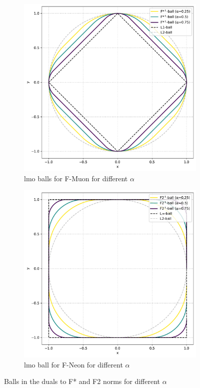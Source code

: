 \documentclass{article} %
\begin{document}
\begin{figure}[h!]
    \centering
    \begin{subfigure}[b]{0.48\linewidth}
        \centering
        \includegraphics[width=\linewidth]{fstardualball.pdf}
        \caption{lmo balls for F-Muon for different $\alpha$}
        \label{fig:fstardual}
    \end{subfigure}
    \hfill
    \begin{subfigure}[b]{0.48\linewidth}
        \centering
        \includegraphics[width=\linewidth]{ftwodualball.pdf}
        \caption{lmo ball for F-Neon for different $\alpha$}
        \label{fig:ftwodual}
    \end{subfigure}
    \caption{Balls in the duals to F* and F2 norms for different $\alpha$}
    \label{fig:fduals}
\end{figure}
\end{document}

